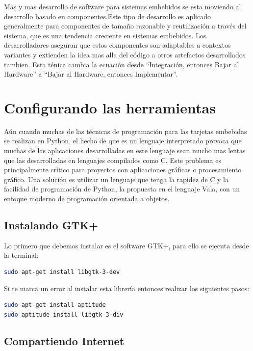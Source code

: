 \documentclass[12pt,twoside]{book}
\begin{document}
Mas y mas desarrollo de software para sistemas embebidos se esta moviendo al desarrollo basado en componentes.Este tipo de desarrollo es aplicado generalmente para componentes de tamaño razonable y reutilización a través del sistema, que es una tendencia creciente en sistemas embebidos. Los desarrolladores aseguran que estos componentes son adaptables a contextos variantes y extienden la idea mas alla del código a otros artefactos desarrollados tambien. Esta ténica cambia la ecuación desde ``Integración, entonces Bajar al Hardware'' a ``Bajar al Hardware, entonces Implementar''.

\chapter{Configurando las herramientas}

Aún cuando muchas de las técnicas de programación para las tarjetas embebidas se realizan en Python, el hecho de que es un lenguaje interpretado provoca que muchas de las aplicaciones desarrolladas en este lenguaje sean mucho mas lentas que las desarrolladas en lenguajes compilados como C. Este problema es principalmente crítico para proyectos con aplicaciones gráficas o procesamiento gráfico. Una solución es utilizar un lenguaje que tenga la rapidez de C y la facilidad de programación de Python, la propuesta en el lenguaje Vala, con un enfoque moderno de programación orientada a objetos.



\section{Instalando GTK+}

Lo primero que debemos instalar es el software GTK+, para ello se ejecuta desde la terminal:
\begin{lstlisting}[language=bash]
sudo apt-get install libgtk-3-dev
\end{lstlisting}

Si te marca un error al instalar esta librería entonces realizar los siguientes pasos:

\begin{lstlisting}[language=bash]
sudo apt-get install aptitude
sudo aptitude install libgtk-3-div
\end{lstlisting}


\section{Compartiendo Internet}
\end{document}
